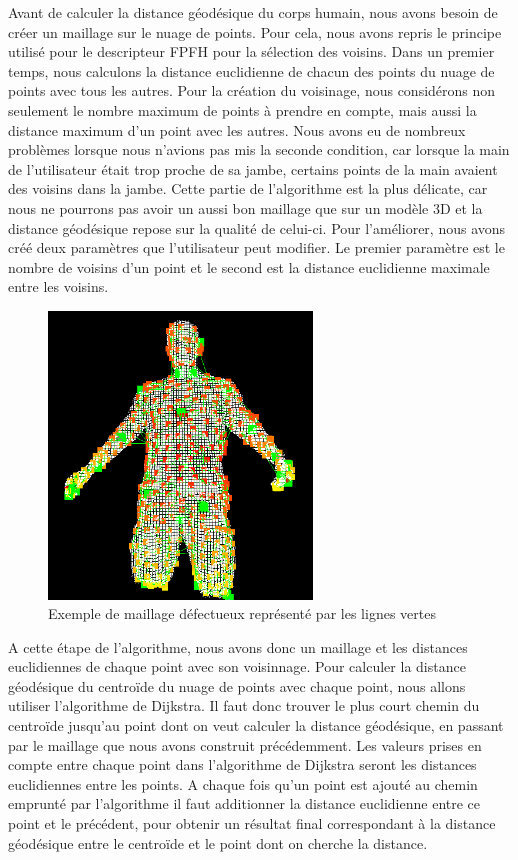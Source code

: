 Avant de calculer la distance géodésique du corps humain, nous avons besoin de créer un maillage sur le nuage de points. Pour cela,
nous avons repris le principe utilisé pour le descripteur FPFH\cite{FPFH} pour la sélection des voisins. Dans un premier temps, nous calculons
la distance euclidienne de chacun des points du nuage de points avec tous les autres. Pour la création du voisinage, nous considérons non
seulement le nombre maximum de points à prendre en compte, mais aussi la distance maximum d'un point avec les autres. Nous avons eu
de nombreux problèmes lorsque nous n'avions pas mis la seconde condition, car lorsque la main de l'utilisateur était trop proche de sa 
jambe, certains points de la main avaient des voisins dans la jambe. Cette partie de l'algorithme est la plus délicate, car nous ne pourrons
pas avoir un aussi bon maillage que sur un modèle 3D et la distance géodésique repose sur la qualité de celui-ci. Pour l'améliorer, nous avons créé deux paramètres que l'utilisateur peut modifier. Le premier paramètre est le nombre de voisins d'un point et
le second est la distance euclidienne maximale entre les voisins.\\

\begin{figure}[!ht]
  \begin{center}
    \includegraphics[width=7cm]{image/maillage.PNG}
    \caption{Exemple de maillage défectueux représenté par les lignes vertes}
    \label{fig:seuillage}
  \end{center}
\end{figure}

A cette étape de l'algorithme, nous avons donc un maillage et les distances euclidiennes de chaque point avec son voisinnage. Pour calculer
la distance géodésique du centroïde du nuage de points avec chaque point, nous allons utiliser l'algorithme de Dijkstra\cite{dijkstra}.
Il faut donc trouver le plus court chemin du centroïde jusqu'au point dont on veut calculer la distance géodésique, en passant par le
maillage que nous avons construit précédemment. Les valeurs prises en compte entre chaque point dans l'algorithme de Dijkstra seront
les distances euclidiennes entre les points. A chaque fois qu'un point est ajouté au chemin emprunté par l'algorithme il faut 
additionner la distance euclidienne entre ce point et le précédent, pour obtenir un résultat final correspondant à la distance 
géodésique entre le centroïde et le point dont on cherche la distance.\\

